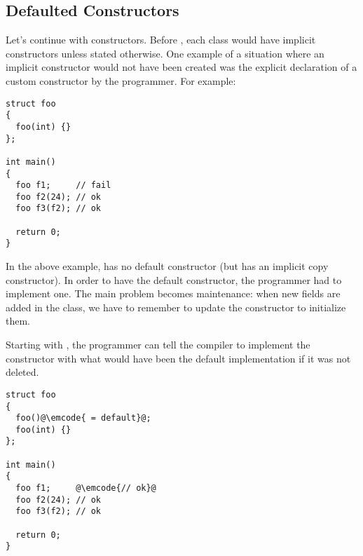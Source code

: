 \subsection{Defaulted Constructors}

Let's continue with constructors. Before , each class would have
implicit constructors unless stated otherwise. One example of a
situation where an implicit constructor would not have been created
was the explicit declaration of a custom constructor by the
programmer. For example:

\begin{lstlisting}
struct foo
{
  foo(int) {}
};

int main()
{
  foo f1;     // fail
  foo f2(24); // ok
  foo f3(f2); // ok

  return 0;
}
\end{lstlisting}

In the above example,  has no default constructor (but has
an implicit copy constructor). In order to have the default
constructor, the programmer had to implement one. The main problem
becomes maintenance: when new fields are added in the class, we have
to remember to update the constructor to initialize them.

Starting with , the programmer can tell the compiler to
implement the constructor with what would have been the default
implementation if it was not deleted.

\begin{lstlisting}
struct foo
{
  foo()@\emcode{ = default}@;
  foo(int) {}
};

int main()
{
  foo f1;     @\emcode{// ok}@
  foo f2(24); // ok
  foo f3(f2); // ok

  return 0;
}
\end{lstlisting}
